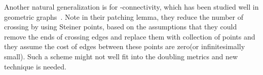 \documentclass{llncs}
\begin{document}
Another natural generalization is for -connectivity, which has been studied well in geometric graphs~\cite{Czumaj06}.
Note in their patching lemma, they reduce the number of crossing by using Steiner points, based on the assumptions that they could remove the ends of crossing edges and replace them with collection of points and they assume the cost of edges between these points are zero(or infinitesimally small).
Such a scheme might not well fit into the doubling metrics and new technique is needed.





























\end{document}
